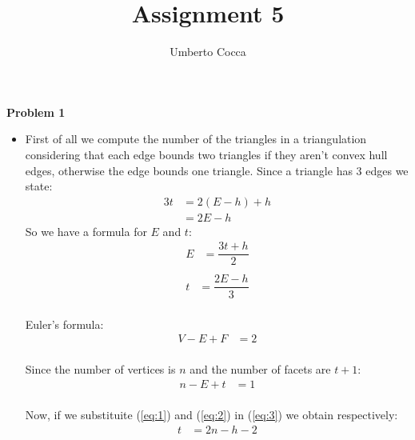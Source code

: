 \documentclass[12pt]{article}
\title{Assignment 5}
\author{Umberto Cocca}
\date{}
\begin{document}
\maketitle
\noindent \textbf{Problem 1}\\

\begin{itemize}
	\item First of all we compute the number of the triangles in a triangulation considering that each edge bounds two triangles if they aren't convex hull edges, otherwise the edge bounds one triangle. Since a triangle has 3 edges we state:
	\begin{equation}
		\begin{aligned}
			3t &= 2(E-h)+h \\
			&= 2E -h
		\end{aligned}
	\end{equation}
	So we have a formula for $E$ and $t$:
	\begin{equation} \label{eq:1}
		\begin{aligned} 
			E &= \dfrac{3t+h}{2} \\
		\end{aligned}
	\end{equation}
	\begin{equation} \label{eq:2}
		\begin{aligned} 
			t &= \dfrac{2E-h}{3} \\
		\end{aligned}
	\end{equation}
	
	Euler's formula:
	\begin{equation} 
		\begin{aligned} 
			V - E + F &= 2 \\
		\end{aligned}
	\end{equation}
	
	Since the number of vertices is $n$ and the number of facets are $t+1$:
	\begin{equation} \label{eq:3}
		\begin{aligned}
			n-E+t &= 1 \\
		\end{aligned}
	\end{equation}
	
	Now, if we substituite (\ref{eq:1}) and (\ref{eq:2}) in (\ref{eq:3}) we obtain respectively:
	\begin{equation}
		\begin{aligned}
			t &= 2n - h - 2 \\
		\end{aligned}
	\end{equation}
	

\end{itemize}
\end{document}
